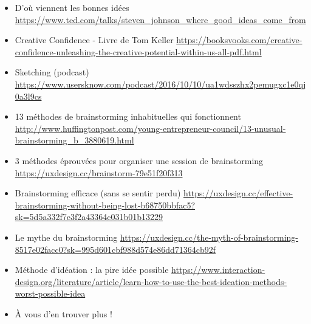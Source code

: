 \begin{itemize}
\item D'où viennent les bonnes idées \url{https://www.ted.com/talks/steven_johnson_where_good_ideas_come_from}
\item Creative Confidence - Livre de Tom Keller \url{https://booksvooks.com/creative-confidence-unleashing-the-creative-potential-within-us-all-pdf.html}
\item Sketching (podcast) \url{https://www.usersknow.com/podcast/2016/10/10/ua1wdsszhx2pemugxc1e0qj0a3l9cs}
\item 13 méthodes de brainstorming inhabituelles qui fonctionnent \url{http://www.huffingtonpost.com/young-entrepreneur-council/13-unusual-brainstorming_b_3880619.html}
\item 3 méthodes éprouvées pour organiser une session de brainstorming \url{https://uxdesign.cc/brainstorm-79e51f20f313}
\item Brainstorming efficace (sans se sentir perdu) \url{https://uxdesign.cc/effective-brainstorming-without-being-lost-b68750bbfac5?sk=5d5a332f7e3f2a43364c031b01b13229}
\item Le mythe du brainstorming \url{https://uxdesign.cc/the-myth-of-brainstorming-8517e02facc0?sk=995d601cbf988d574e86dd71364cb92f}
\item Méthode d'idéation : la pire idée possible \url{https://www.interaction-design.org/literature/article/learn-how-to-use-the-best-ideation-methods-worst-possible-idea}
\item À vous d'en trouver plus !
\end{itemize}

